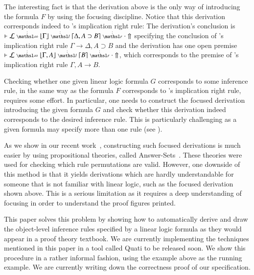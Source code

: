 \documentclass[a4paper,10pt]{article}
\newcommand\lra{\longrightarrow}
\begin{document}
The interesting fact is that the derivation above is the only way of
introducing the formula $F$ by using the focusing discipline. Notice that this
derivation corresponds indeed to \mLJ's implication right rule: The derivation's
conclusion is $\llfDash \lEnc \ndots{\infty} \lft{\Gamma} \ndots{l}
{\rght{\Delta, A \supset B}} \ndots{r} \cdot \Uparrow$ specifying the conclusion
of \mLJ's implication right rule $\Gamma \lra \Delta, A \supset B$ and the
derivation has one open premise $\llfDash \lEnc \ndots{\infty} \lft{\Gamma, A}
\ndots{l} \rght{B} \ndots{r} \cdot \Uparrow$, which corresponds to the premise
of \mLJ's implication right rule $\Gamma, A \lra B$.

Checking whether one given linear logic formula $G$ corresponds to some
inference rule, in the same way as the formula $F$ corresponds to \mLJ's
implication right rule, requires some effort. In particular, one needs
to construct the focused derivation introducing the given formula $G$ and check whether this derivation indeed
corresponds to the desired inference rule. This is particularly challenging as a given formula may specify 
more than one rule (see \cite{nigam.jlc}). 

As we show in our recent work~\cite{nigam13iclp}, constructing such focused derivations is 
much easier by using propositional theories, called Answer-Sets~\cite{gelfond90iclp}. These theories were used for
checking which rule permutations are valid. However, one downside of this method is that it 
yields derivations which are hardly understandable for someone that is not familiar with linear logic, 
such as the focused derivation shown above. This is a serious limitation as it requires
a deep understanding of focusing in order to understand the proof figures printed.

This paper solves this problem by showing how to automatically derive and draw
the object-level inference rules
specified by a linear logic formula as they would appear in a proof theory textbook. We are currently
implementing the techniques mentioned in this paper in a tool called Quati to be released soon.
We show this procedure in a rather informal fashion, using the example above as
the running example. 
We are currently writing down the correctness proof of our specification.

\end{document}
